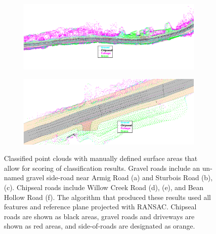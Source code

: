 \documentclass[journal,onecolumn]{IEEEtran}
\begin{document}
\begin{figure}[H]
\begin{subfigure}{0.495\textwidth}
			\caption[]{}
			\label{fig:long_chip_classified}
		\end{subfigure}
		\begin{subfigure}{0.495\textwidth}
			\centering
			\includegraphics[width=0.95\linewidth]{figures/long_chip_redux_2}
			\caption[]{}
			\label{fig:long_chip_2_classified}
		\end{subfigure}
		\begin{subfigure}{0.495\textwidth}
			\centering
			\includegraphics[width=0.95\linewidth]{figures/short_chip_redux}
			\caption[]{}
			\label{fig:short_chip_classified}
		\end{subfigure}
		\caption[Classified Point Clouds]{Classified point clouds with manually defined surface areas that allow for scoring of classification results. Gravel roads include an un-named gravel side-road near Armig Road (a) and Sturbois Road (b), (c). Chipseal roads include Willow Creek Road (d), (e), and Bean Hollow Road (f). The algorithm that produced these results used all features and reference plane projected with RANSAC. Chipseal roads are shown as black areas, gravel roads and driveways are shown as red areas, and side-of-roads are designated as orange. }
		\label{fig:classified_point_clouds_all}
	\end{figure}
\end{document}
